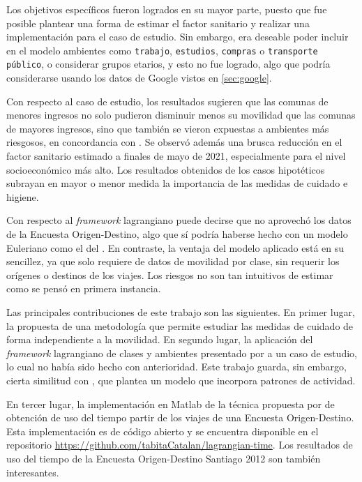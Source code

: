 \begin{conclusion} \label{chap:conclu}


Los objetivos específicos fueron logrados en su mayor parte, puesto que fue posible plantear una forma de estimar el factor sanitario y realizar una implementación para el caso de estudio. Sin embargo, era deseable poder incluir en el modelo ambientes como \texttt{trabajo}, \texttt{estudios}, \texttt{compras} o \texttt{transporte público}, o considerar grupos etarios, y esto no fue logrado, algo que podría considerarse usando los datos de Google vistos en \ref{sec:google}.

Con respecto al caso de estudio, los resultados sugieren que las comunas de menores ingresos no solo pudieron disminuir menos su movilidad que las comunas de mayores ingresos, sino que también se vieron expuestas a ambientes más riesgosos, en concordancia con \cite{Chang2021}. Se observó además una brusca reducción en el factor sanitario estimado a finales de mayo de 2021, especialmente para el nivel socioeconómico más alto. Los resultados obtenidos de los casos hipotéticos subrayan en mayor o menor medida la importancia de las medidas de cuidado e higiene.

Con respecto al \textit{framework} lagrangiano puede decirse que no aprovechó los datos de la Encuesta Origen-Destino, algo que sí podría haberse hecho con un modelo Euleriano  como el del \cite{Lai2020}. En contraste, la ventaja del modelo aplicado está en su sencillez, ya que solo requiere de datos de movilidad por clase, sin requerir los orígenes o destinos de los viajes. Los riesgos no son tan intuitivos de estimar como se pensó en primera instancia.

Las principales contribuciones de este trabajo son las siguientes. En primer lugar, la propuesta de una metodología que permite estudiar las medidas de cuidado de forma independiente a la movilidad. En segundo lugar, la aplicación del \textit{framework} lagrangiano de clases y ambientes presentado por \cite{Bichara2018} a un caso de estudio, lo cual no había sido hecho con anterioridad. Este trabajo guarda, sin embargo, cierta similitud con \cite{Shikhmurzaev}, que plantea un modelo que incorpora patrones de actividad.

En tercer lugar, la implementación en Matlab de la técnica propuesta por \cite{Munizaga2011} de obtención de uso del tiempo partir de los viajes de una Encuesta Origen-Destino. Esta implementación es de código abierto y se encuentra disponible en el repositorio \url{https://github.com/tabitaCatalan/lagrangian-time}. Los resultados de uso del tiempo de la Encuesta Origen-Destino Santiago 2012 son también interesantes.


\end{conclusion}

